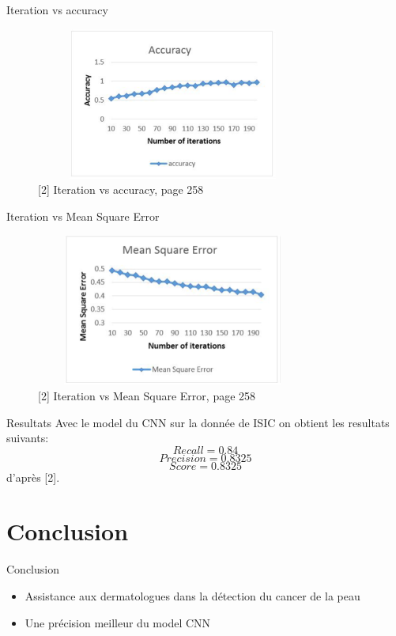 \documentclass{beamer}
\begin{document}
\begin{frame}{Iteration vs accuracy}
\begin{figure}[H]
    \includegraphics[width=9cm,height=5cm]{images/discuss_3.png}
    \caption{[2] Iteration vs accuracy, page 258}
    \label{fig:L1}
\end{figure} 
\end{frame}

\begin{frame}{Iteration vs Mean Square Error}
\begin{figure}[H]
    \includegraphics[width=9cm,height=5cm]{images/discuss_4.png}
    \caption{[2] Iteration vs Mean Square Error, page 258}
    \label{fig:L1}
\end{figure} 
\end{frame}

\begin{frame}{Resultats}
Avec le model du CNN sur la donnée de ISIC on obtient les resultats suivants:
$$Recall = 0.84$$
$$Precision = 0.8325$$
$$Score = 0.8325$$
d'après [2].
\end{frame}


\section{Conclusion}
\begin{frame}{Conclusion}
\begin{itemize}
		\item Assistance aux dermatologues dans la détection du cancer de la peau 
		\item Une précision meilleur du model CNN
\end{itemize}
\end{frame}
\end{document}
